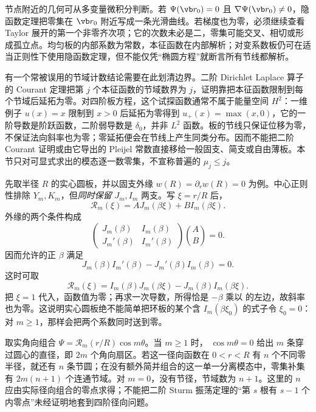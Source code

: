 节点附近的几何可从多变量微积分判断。若 \(\Psi(\vb r_0)=0\) 且
\(\nabla\Psi(\vb r_0)\ne0\)，隐函数定理把零集在 \(\vb r_0\) 附近写成一条光滑曲线。若梯度也为零，必须继续查看 Taylor 展开的第一个非零齐次项；它的次数未必是二，零集可能交叉、相切或形成孤立点。均匀板的内部系数为常数，本征函数在内部解析；对变系数板仍可在适当正则性下使用隐函数定理，但不能仅凭“椭圆方程”就断言所有节线都解析。

有一个常被误用的节域计数结论需要在此划清边界。二阶 Dirichlet Laplace 算子的 Courant 定理把第 \(j\) 个本征函数的节域数界为 \(j\)，证明靠把本征函数限制到每个节域后延拓为零。对四阶板方程，这个试探函数通常不属于能量空间 \(H^2\)：一维例子
\(u(x)=x\) 限制到 \(x>0\) 后延拓为零得到 \(u_+(x)=\max(x,0)\)，它的一阶导数是阶跃函数，二阶弱导数是 \(\delta_0\)，并非 \(L^2\) 函数。板的节线只保证位移为零，不保证法向斜率也为零；零延拓便会在节线上产生同类分布。因而不能把二阶 Courant 证明或由它导出的 Pleijel 常数直接移给一般固支、简支或自由薄板。本节只对可显式求出的模态逐一数零集，不宣称普遍的 \(\mu_j\le j\)。

先取半径 \(R\) 的实心圆板，并以固支外缘 \(w(R)=\partial_rw(R)=0\) 为例。中心正则性排除 \(Y_m,K_m\)，但\emph{同时保留} \(J_m,I_m\) 两支。写 \(\xi=r/R\) 后，
\[
 \mathcal R_m(\xi)=A J_m(\beta\xi)+B I_m(\beta\xi).
\]
外缘的两个条件构成
\[
 \begin{pmatrix}
  J_m(\beta)&I_m(\beta)\\
  J_m'(\beta)&I_m'(\beta)
 \end{pmatrix}
 \binom{A}{B}=0.
\]
因而允许的正 \(\beta\) 满足
\begin{equation}
 J_m(\beta)I_m'(\beta)-J_m'(\beta)I_m(\beta)=0.
 \label{eq:phys-sm-clamped-disk-characteristic}
\end{equation}
这时可取
\[
 \mathcal R_m(\xi)
 =I_m(\beta)J_m(\beta\xi)-J_m(\beta)I_m(\beta\xi).
\]
把 \(\xi=1\) 代入，函数值为零；再求一次导数，所得恰是
\(-\beta\) 乘以 的左边，故斜率也为零。这说明实心圆板绝不能简单把环板的某个含 \(I_m(\beta\xi_0)\) 的式子令 \(\xi_0=0\)：对 \(m\ge1\)，那样会把两个系数同时送到零。

取实角向组合 \(\Psi=\mathcal R_m(r/R)\cos m\theta\)。当 \(m\ge1\) 时，
\(\cos m\theta=0\) 给出 \(m\) 条穿过圆心的直径，即 \(2m\) 个角向扇区。若这一径向函数在 \(0<r<R\) 有 \(n\) 个不同零半径，就还有 \(n\) 条节圆；在没有额外简并组合的这一单一分离模态中，零集补集有 \(2m(n+1)\) 个连通节域。对 \(m=0\)，没有节径，节域数为 \(n+1\)。这里的 \(n\) 应由实际径向组合的零点求得；不能把二阶 Sturm 振荡定理的“第 \(s\) 根有 \(s-1\) 个内零点”未经证明地套到四阶径向问题。

